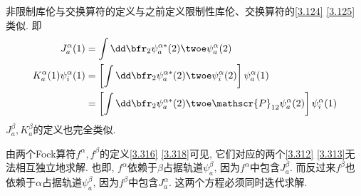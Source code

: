 非限制库伦与交换算符的定义与之前定义限制性库伦、交换算符的\autoref{3.124}
\autoref{3.125}类似.
即
\begin{align}
	J_a^\alpha(1) & = \int \dd\bfr_2 \psi_a^{\alpha*}(2) \twoe \psi_a^\alpha(2) \label{3.319}\\
	K_a^\alpha(1)\psi_i^\alpha(1) 
	    &= \left[ \int \dd\bfr_2 \psi_a^{\alpha*}(2) \twoe \psi_i^\alpha(2)\right] \psi_a^\alpha(1) \notag\\
	    &= \left[ \int \dd\bfr_2 \psi_a^{\alpha*}(2) \twoe \mathscr{P}_{12}\psi_a^\alpha(2)\right] \psi_i^\alpha(1) \label{3.320}
\end{align}
$J_a^\beta,K_a^\beta$的定义也完全类似. 

由两个Fock算符$f^\alpha,f^\beta$的定义\autoref{3.316} \autoref{3.318}可见, 
它们对应的两个\autoref{3.312} \autoref{3.313}无法相互独立地求解. 
也即, 
$f^\alpha$依赖于$\beta$占据轨道$\psi_a^\beta$, 
因为$f^\alpha$中包含$J_a^\beta$. 
而反过来$f^\beta$也依赖于$\alpha$占据轨道$\psi_a^\beta$, 
因为$f^\beta$中包含$J_a^\alpha$. 
这两个方程必须同时迭代求解. 


